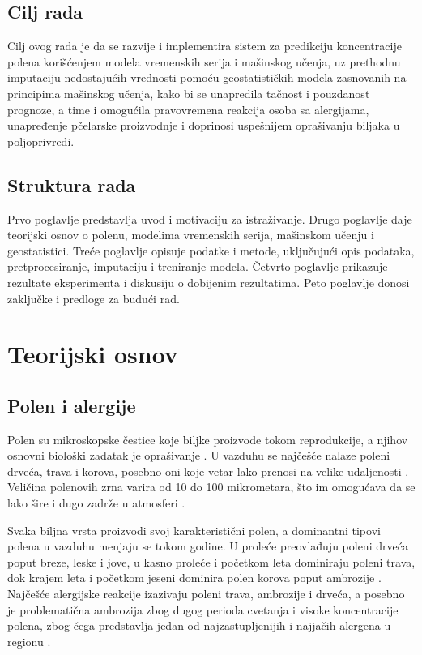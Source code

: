 \documentclass[12pt]{article}
\begin{document}
\subsection{Cilj rada}
Cilj ovog rada je da se razvije i implementira sistem za predikciju koncentracije polena korišćenjem modela vremenskih serija i mašinskog učenja, uz prethodnu imputaciju nedostajućih vrednosti pomoću geostatističkih modela zasnovanih na principima mašinskog učenja, kako bi se unapredila tačnost i pouzdanost prognoze, a time i omogućila pravovremena reakcija osoba sa alergijama, unapređenje pčelarske proizvodnje i doprinosi uspešnijem oprašivanju biljaka u poljoprivredi.

\subsection{Struktura rada}
Prvo poglavlje predstavlja uvod i motivaciju za istraživanje. Drugo poglavlje daje teorijski osnov o polenu, modelima vremenskih serija, mašinskom učenju i geostatistici. Treće poglavlje opisuje podatke i metode, uključujući opis podataka, pretprocesiranje, imputaciju i treniranje modela. Četvrto poglavlje prikazuje rezultate eksperimenta i diskusiju o dobijenim rezultatima. Peto poglavlje donosi zaključke i predloge za budući rad.
\newpage
\section{Teorijski osnov}

\subsection{Polen i alergije}
Polen su mikroskopske čestice koje biljke proizvode tokom reprodukcije, a njihov osnovni biološki zadatak je oprašivanje \cite{pollenBio2021}. U vazduhu se najčešće nalaze poleni drveća, trava i korova, posebno oni koje vetar lako prenosi na velike udaljenosti \cite{sofia2023}. Veličina polenovih zrna varira od 10 do 100 mikrometara, što im omogućava da se lako šire i dugo zadrže u atmosferi \cite{piotrowska2012}.

Svaka biljna vrsta proizvodi svoj karakteristični polen, a dominantni tipovi polena u vazduhu menjaju se tokom godine. U proleće preovlađuju poleni drveća poput breze, leske i jove, u kasno proleće i početkom leta dominiraju poleni trava, dok krajem leta i početkom jeseni dominira polen korova poput ambrozije \cite{birch2019}. Najčešće alergijske reakcije izazivaju poleni trava, ambrozije i drveća, a posebno je problematična ambrozija zbog dugog perioda cvetanja i visoke koncentracije polena, zbog čega predstavlja jedan od najzastupljenijih i najjačih alergena u regionu \cite{omalizumab2022}.
\end{document}
